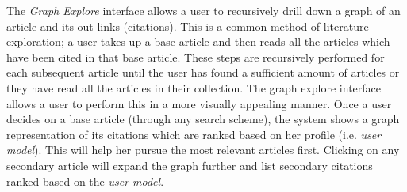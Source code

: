 The \textsl{Graph Explore} interface allows a user to recursively 
drill down a graph of an article and its out-links (citations).
This is a common method of literature exploration; a user takes up a base article and then reads all the articles which have been cited in that base article.
These steps are recursively performed for each subsequent article until the user has found a sufficient amount of articles or they have read all the articles in their collection.
The graph explore interface allows a user to perform this in a more visually appealing manner.
Once a user decides on a base article (through any search scheme), the system shows a graph representation of its citations which are ranked based on her profile (i.e. \textsl{user model}).
This will help her pursue the most relevant articles first.
Clicking on any secondary article will expand the graph further and 
list secondary citations ranked based on the \textsl{user model}.
